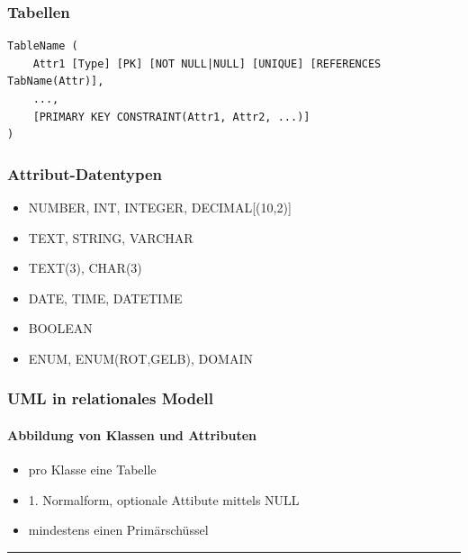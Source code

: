         \subsubsection{Tabellen}
            \begin{lstlisting}[style=SQL]
TableName (
    Attr1 [Type] [PK] [NOT NULL|NULL] [UNIQUE] [REFERENCES TabName(Attr)],
    ...,    
    [PRIMARY KEY CONSTRAINT(Attr1, Attr2, ...)]
)
            \end{lstlisting}
            \begin{multicols}{2}
            \subsubsection{Attribut-Datentypen}
                \begin{itemize}
                \setlength{\itemsep}{0pt}  
                  \item NUMBER, INT, INTEGER, DECIMAL[(10,2)]
                  \item TEXT, STRING, VARCHAR
                  \item TEXT(3), CHAR(3)
                  \item DATE, TIME, DATETIME
                  \item BOOLEAN
                  \item ENUM, ENUM(ROT,GELB), DOMAIN
                \end{itemize}
            \subsubsection{UML in relationales Modell}
                \paragraph{Abbildung von Klassen und Attributen}
                    \begin{itemize}
                    \setlength{\itemsep}{0pt}    
                        \item pro Klasse eine Tabelle
                        \item 1. Normalform, optionale Attibute mittels NULL
                        \item mindestens einen Primärschüssel
                    \end{itemize}
            \end{multicols}                    
    \hrule